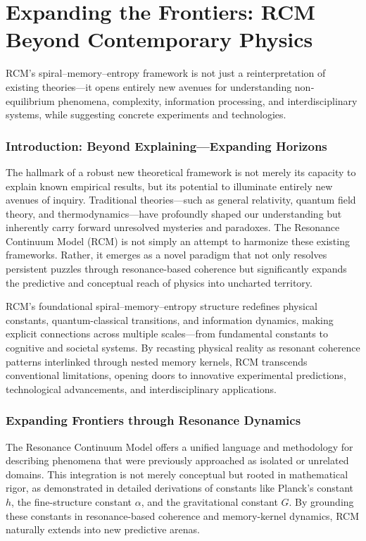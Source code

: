 \chapter{Expanding the Frontiers: RCM Beyond Contemporary Physics}


\begin{concept}
RCM’s spiral–memory–entropy framework is not just a reinterpretation of existing theories—it opens entirely new avenues for understanding non‐equilibrium phenomena, complexity, information processing, and interdisciplinary systems, while suggesting concrete experiments and technologies.
\end{concept}

\subsection{Introduction: Beyond Explaining—Expanding Horizons}

The hallmark of a robust new theoretical framework is not merely its capacity to explain known empirical results, but its potential to illuminate entirely new avenues of inquiry. Traditional theories—such as general relativity, quantum field theory, and thermodynamics—have profoundly shaped our understanding but inherently carry forward unresolved mysteries and paradoxes. The Resonance Continuum Model (RCM) is not simply an attempt to harmonize these existing frameworks. Rather, it emerges as a novel paradigm that not only resolves persistent puzzles through resonance-based coherence but significantly expands the predictive and conceptual reach of physics into uncharted territory.

RCM's foundational spiral–memory–entropy structure redefines physical constants, quantum-classical transitions, and information dynamics, making explicit connections across multiple scales—from fundamental constants to cognitive and societal systems. By recasting physical reality as resonant coherence patterns interlinked through nested memory kernels, RCM transcends conventional limitations, opening doors to innovative experimental predictions, technological advancements, and interdisciplinary applications.

\subsection{Expanding Frontiers through Resonance Dynamics}

The Resonance Continuum Model offers a unified language and methodology for describing phenomena that were previously approached as isolated or unrelated domains. This integration is not merely conceptual but rooted in mathematical rigor, as demonstrated in detailed derivations of constants like Planck’s constant $h$, the fine-structure constant $\alpha$, and the gravitational constant $G$. By grounding these constants in resonance-based coherence and memory-kernel dynamics, RCM naturally extends into new predictive arenas.

